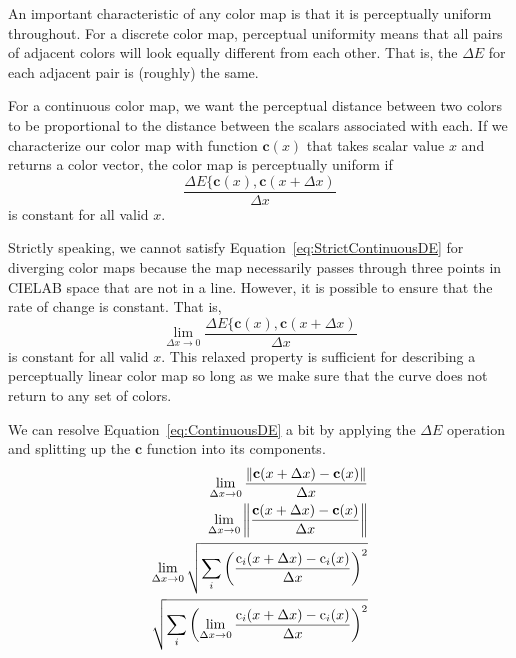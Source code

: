 \documentclass[review,journal]{vgtc}         %
\newcommand{\Lab}{CIELAB\xspace}
\newcommand{\DeltaE}{\ensuremath{\Delta{}E}\xspace}
\newcommand*{\cvec}[1]{\mathbf{#1}}
\begin{document}
An important characteristic of any color map is that it is perceptually
uniform throughout.  For a discrete color map, perceptual uniformity means
that all pairs of adjacent colors will look equally different from each
other.  That is, the \DeltaE for each adjacent pair is (roughly) the same.

For a continuous color map, we want the perceptual distance between two
colors to be proportional to the distance between the scalars associated
with each.    If we characterize our color map with function $\cvec{c}(x)$
that takes scalar value $x$ and returns a color vector, the color map is
perceptually uniform if
\begin{equation}
  \frac{\DeltaE\{\cvec{c}(x),\cvec{c}(x+\Delta{x})}{\Delta{}x}
  \label{eq:StrictContinuousDE}
\end{equation}
is constant for all valid $x$.

Strictly speaking, we cannot satisfy Equation~\ref{eq:StrictContinuousDE}
for diverging color maps because the map necessarily passes through three
points in \Lab space that are not in a line.  However, it is possible to
ensure that the rate of change is constant.  That is,
\begin{equation}
  \lim_{\Delta{}x \rightarrow 0}{
    \frac{\DeltaE\{\cvec{c}(x),\cvec{c}(x+\Delta{x})}{\Delta{}x} }
  \label{eq:ContinuousDE}
\end{equation}
is constant for all valid $x$.  This relaxed property is sufficient for
describing a perceptually linear color map so long as we make sure that the
curve does not return to any set of colors.

We can resolve Equation~\ref{eq:ContinuousDE} a bit by applying the \DeltaE
operation and splitting up the $\cvec{c}$ function into its components.
\begin{equation}
  \begin{split}
    { \lim_{\Delta x \rightarrow 0}
      \frac{\left\lVert \cvec{c}(x+\Delta x) - \cvec{c}(x) \right\rVert}
      {\Delta x}} \\
    { \lim_{\Delta x \rightarrow 0}
      \left\lVert \frac{\cvec{c}(x+\Delta x)- \cvec{c}(x)}
	  {\Delta x} \right\rVert } \\
    { \lim_{\Delta x \rightarrow 0}
      \sqrtsign{ \sum_i \left( \frac
	  {\operatorname{c}_i(x+\Delta x)
	    - \operatorname{c}_i(x)}
	  {\Delta x} \right)^2 } } \\
    {\sqrtsign{ \sum_i \left( \lim_{\Delta x \rightarrow 0}
       \frac
	  {\operatorname{c}_i(x+\Delta x)
	    - \operatorname{c}_i(x)}
	  {\Delta x} \right)^2 } }
  \end{split}
  \label{eqn:dE_limit}
\end{equation}
\end{document}
